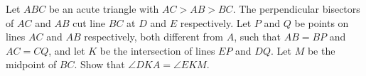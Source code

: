 Let $ABC$ be an acute triangle with $AC > AB > BC$. The perpendicular bisectors of $AC$ and $AB$ cut line $BC$ at $D$ and $E$ respectively. Let $P$ and $Q$ be points on lines $AC$ and $AB$ respectively, both different from $A$,  such that $AB = BP$ and $AC = CQ$,  and let $K$ be the intersection of lines $EP$ and $DQ$. Let $M$ be the midpoint of $BC$. Show that $\angle DKA = \angle EKM$.